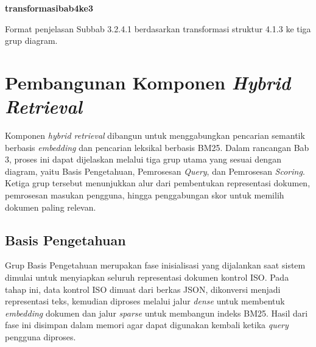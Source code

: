 \documentclass[12pt,a4paper]{article}
\begin{document}
\begin{center}
\textbf{transformasibab4ke3}\par
\vspace{6pt}
Format penjelasan Subbab 3.2.4.1 berdasarkan transformasi struktur 4.1.3 ke tiga grup diagram.
\end{center}

\section*{Pembangunan Komponen \textit{Hybrid Retrieval}}

Komponen \textit{hybrid retrieval} dibangun untuk menggabungkan pencarian semantik berbasis \textit{embedding} dan pencarian leksikal berbasis BM25. Dalam rancangan Bab 3, proses ini dapat dijelaskan melalui tiga grup utama yang sesuai dengan diagram, yaitu Basis Pengetahuan, Pemrosesan \textit{Query}, dan Pemrosesan \textit{Scoring}. Ketiga grup tersebut menunjukkan alur dari pembentukan representasi dokumen, pemrosesan masukan pengguna, hingga penggabungan skor untuk memilih dokumen paling relevan.

\subsection*{Basis Pengetahuan}

Grup Basis Pengetahuan merupakan fase inisialisasi yang dijalankan saat sistem dimulai untuk menyiapkan seluruh representasi dokumen kontrol ISO. Pada tahap ini, data kontrol ISO dimuat dari berkas JSON, dikonversi menjadi representasi teks, kemudian diproses melalui jalur \textit{dense} untuk membentuk \textit{embedding} dokumen dan jalur \textit{sparse} untuk membangun indeks BM25. Hasil dari fase ini disimpan dalam memori agar dapat digunakan kembali ketika \textit{query} pengguna diproses.
\end{document}
